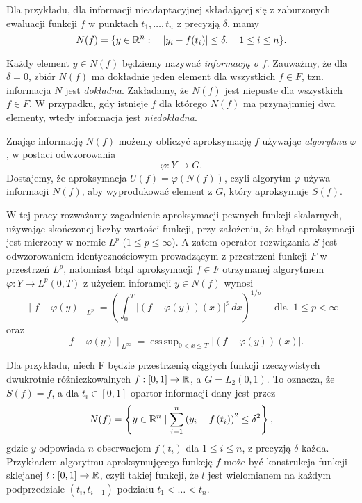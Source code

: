 \documentclass[oik, pdftex, robocza, man]{mgrwms}
\DeclareMathOperator*{\esssup}{ess\,sup}
\begin{document}
    Dla przykładu, dla informacji nieadaptacyjnej składającej się z zaburzonych ewaluacji funkcji $f$ w punktach $t_{1}, \dots, t_{n}$ z precyzją $\delta$, mamy
    \begin{equation*}
        N(f) = \{y \in \mathbb{R}^{n} : \quad |y_{i} - f(t_{i})| \leq \delta, \quad 1 \leq i \leq n\}.
    \end{equation*}
    
    Każdy element $y \in N(f)$ będziemy nazywać \textit{informacją o $f$}. Zauważmy, że dla $\delta = 0$, zbiór $N(f)$ ma dokładnie jeden element dla wszystkich $f \in F$, tzn. informacja $N$ jest \textit{dokładna}. Zakładamy, że $N(f)$ jest niepuste dla wszystkich $f \in F$. W przypadku, gdy istnieje $f$ dla którego $N(f)$ ma przynajmniej dwa elementy, wtedy informacja jest \textit{niedokładna}.

    Znając informację $N(f)$ możemy obliczyć aproksymację $f$ używając \textit{algorytmu} $\varphi$, w postaci odwzorowania
    \begin{equation*}
        \varphi : Y \rightarrow G.
    \end{equation*}
    Dostajemy, że aproksymacja $U(f) = \varphi(N(f))$, czyli algorytm $\varphi$ używa informacji $N(f)$, aby wyprodukować element z $G$, który aproksymuje $S(f)$.

    W tej pracy rozważamy zagadnienie aproksymacji pewnych funkcji skalarnych, używając skończonej liczby wartości funkcji, przy założeniu, że błąd aproksymacji jest mierzony w normie $L^{p}$ ($1 \leq p \leq \infty$). A zatem operator rozwiązania $S$ jest odwzorowaniem identycznościowym prowadzącym z przestrzeni funkcji $F$ w przestrzeń $L^{p}$, natomiast błąd aproksymacji $f \in F$ otrzymanej algorytmem $\varphi : Y \rightarrow L^{p}(0,T)$ z użyciem inforamcji $y \in N(f)$ wynosi
    \begin{equation*}
        \|f-\varphi(y)\|_{L^p} = \left( \int_{0}^{T} |(f-\varphi(y))(x)|^p \,dx  \right)^{1/p} \quad \text{ dla } \; 1 \leq p < \infty
    \end{equation*}
    oraz
    \begin{equation*}
        \|f-\varphi(y)\|_{L^\infty} = \esssup_{0 < x \leq T} | (f - \varphi(y))(x) |.
    \end{equation*}


    Dla przykładu, niech F będzie przestrzenią ciągłych funkcji rzeczywistych dwukrotnie różniczkowalnych $f: [0,1] \rightarrow \mathbb{R}$, a $G=L_{2}(0,1)$. To oznacza, że $S(f) = f$, a dla $t_{i} \in [0,1]$ opartor informacji dany jest przez
    \begin{equation*}
        N(f)=\left\{y \in \mathbb{R}^{n} \mid \sum_{i=1}^{n}\left(y_{i}-f\left(t_{i}\right)\right)^{2} \leq \delta^{2}\right\},
    \end{equation*}
    gdzie $y$ odpowiada $n$ obserwacjom $f(t_{i})$ dla $1 \leq i \leq n$, z precyzją $\delta$ każda. Przykładem algorytmu aproksymujęcego funkcję $f$ może być konstrukcja funkcji sklejanej $l: [0,1] \rightarrow \mathbb{R}$, czyli takiej funkcji, że $l$ jest wielomianem na każdym podprzedziale $(t_{i}, t_{i+1})$ podziału $t_{1} < \ldots < t_{n}$.
\end{document}
